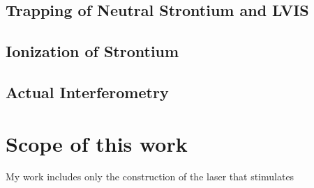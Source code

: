 \subsection{Trapping of Neutral Strontium and LVIS}



\subsection{Ionization of Strontium}

\subsection{Actual Interferometry}

\section{Scope of this work}
My work includes only the construction of the laser that stimulates
